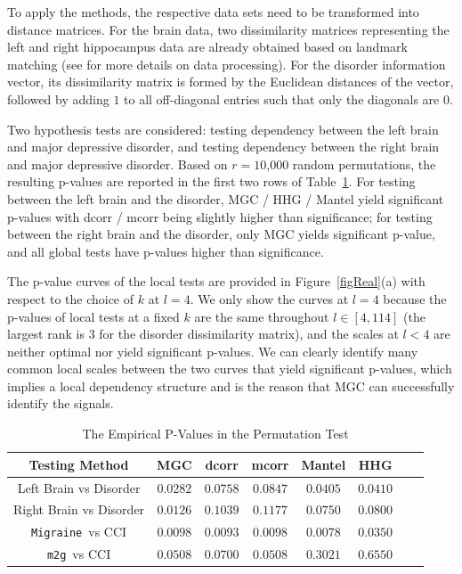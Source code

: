 \documentclass[11pt]{article}
\providecommand{\sct}[1]{{\sc \texttt{#1}}}
\newcommand{\Migraine}{\sct{Migraine}}
\newcommand{\mtg}{\sct{m2g}}
\begin{document}
To apply the methods, the respective data sets need to be transformed into distance matrices. For the brain data, two dissimilarity matrices representing the left and right hippocampus data are already obtained based on landmark matching (see \cite{ParkEtAl2011} for more details on data processing). For the disorder information vector,
its dissimilarity matrix is formed by the Euclidean distances of the vector, followed by adding $1$ to all off-diagonal entries such that only the diagonals are $0$.

Two hypothesis tests are considered: testing dependency between the left brain and major depressive disorder, and testing dependency between the right brain and major depressive disorder. Based on $r=10$,$000$ random permutations, the resulting p-values are reported in the first two rows of Table~\ref{table1}. For testing between the left brain and the disorder, MGC / HHG / Mantel yield significant p-values with dcorr / mcorr being slightly higher than significance; for testing between the right brain and the disorder, only MGC yields significant p-value, and all global tests have p-values higher than significance. 

The p-value curves of the local tests are provided in Figure~\ref{figReal}(a) with respect to the choice of $k$ at $l=4$. We only show the curves at $l=4$ because the p-values of local tests at a fixed $k$ are the same throughout $l \in [4,114]$ (the largest rank is $3$ for the disorder dissimilarity matrix), and the scales at $l<4$ are neither optimal nor yield significant p-values. We can clearly identify many common local scales between the two curves that yield significant p-values, which implies a local dependency structure and is the reason that MGC can successfully identify the signals. %


\begin{table}[!t]
\footnotesize
\renewcommand{\arraystretch}{0.5}
\centering
{\begin{tabular}{|c||c|c|c|c|c|c|c|}
\hline
Testing Method & MGC & dcorr & mcorr & Mantel & HHG \\
\hline
Left Brain vs Disorder  & $0.0282$ & $0.0758$ & $0.0847$ & $0.0405$ & $0.0410$ \\
\hline
Right Brain vs Disorder & $0.0126$ & $0.1039$ & $0.1177$  & $0.0750$ & $0.0800$\\
\hline
\Migraine~vs CCI & $0.0098$ & $0.0093$ & $0.0098$  & $0.0078$ & $0.0350$\\
\hline
\mtg~vs CCI & $0.0508$ & $0.0700$ & $0.0508$  & $0.3021$ & $0.6550$\\
\hline
\end{tabular}
\caption{The Empirical P-Values in the Permutation Test}
\label{table1}
}
\end{table}
\end{document}
